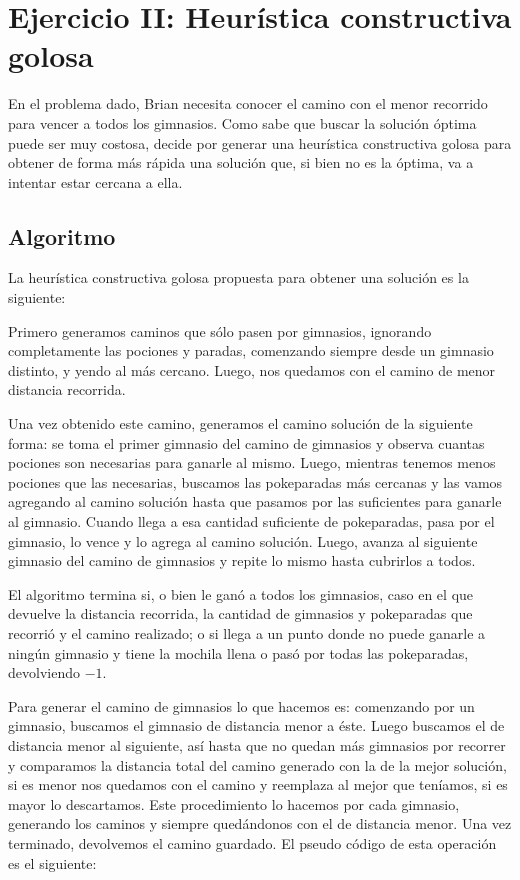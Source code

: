 \section{Ejercicio II: Heurística constructiva golosa}

En el problema dado, Brian necesita conocer el camino con el menor recorrido para vencer a todos los gimnasios. Como sabe que buscar la solución óptima puede ser muy costosa, decide por generar una heurística constructiva golosa para obtener de forma más rápida una solución que, si bien no es la óptima, va a intentar estar cercana a ella.

\subsection{Algoritmo}

La heurística constructiva golosa propuesta para obtener una solución es la siguiente:

Primero generamos caminos que sólo pasen por gimnasios, ignorando completamente las pociones y paradas, comenzando siempre desde un gimnasio distinto, y yendo al más cercano. Luego, nos quedamos con el camino de menor distancia recorrida. 

Una vez obtenido este camino, generamos el camino solución de la siguiente forma: se toma el primer gimnasio del camino de gimnasios y observa cuantas pociones son necesarias para ganarle al mismo. Luego, mientras tenemos menos pociones que las necesarias, buscamos las pokeparadas más cercanas y las vamos agregando al camino solución hasta que pasamos por las suficientes para ganarle al gimnasio. Cuando llega a esa cantidad suficiente de pokeparadas, pasa por el gimnasio, lo vence y lo agrega al camino solución. Luego, avanza al siguiente gimnasio del camino de gimnasios y repite lo mismo hasta cubrirlos a todos.

El algoritmo termina si, o bien le ganó a todos los gimnasios, caso en el que devuelve la distancia recorrida, la cantidad de gimnasios y pokeparadas que recorrió y el camino realizado; o si llega a un punto donde no puede ganarle a ningún gimnasio y tiene la mochila llena o pasó por todas las pokeparadas, devolviendo $-1$.

Para generar el camino de gimnasios lo que hacemos es: comenzando por un gimnasio, buscamos el gimnasio de distancia menor a éste. Luego buscamos el de distancia menor al siguiente, así hasta que no quedan más gimnasios por recorrer y comparamos la distancia total del camino generado con la de la mejor solución, si es menor nos quedamos con el camino y reemplaza al mejor que teníamos, si es mayor lo descartamos. Este procedimiento lo hacemos por cada gimnasio, generando los caminos y siempre quedándonos con el de distancia menor. Una vez terminado, devolvemos el camino guardado. El pseudo código de esta operación es el siguiente:

